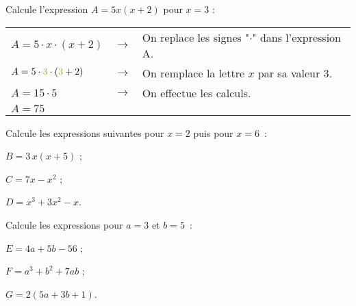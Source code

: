 \begin{methode*1}
 
\begin{exemple*1}
Calcule l'expression $A = 5x(x + 2)$ pour $x = 3$ :
\begin{center}
 \begin{tabular}{lcl}
$A = 5 \cdot x \cdot (x + 2)$ & $\longrightarrow$ & On replace les signes "$\cdot$" dans l'expression A. \\
$A = 5 \cdot \textcolor{H1}{3} \cdot (\textcolor{H1}{3} + 2)$ & $\longrightarrow$ & On remplace la lettre $x$ par sa valeur \textcolor{H1}{3}. \\ %
$A = 15 \cdot 5$ & $\longrightarrow$ &  On effectue les calculs. \\
$A= 75$ & & \\
  \end{tabular}
 \end{center}
\end{exemple*1}

\exercice  
Calcule les expressions suivantes pour $x = 2$ puis pour $x = 6$ :

$B = 3\,x(x + 5)$ ;

$C = 7x - x^2$ ;

$D = x^3 + 3x^2 - x$.

\exercice  
Calcule les expressions pour $a = 3$ et $b = 5$ :
     
$E = 4a + 5b - 56$ ;

$F = a^3 + b^2 + 7ab$ ;

$G = 2(5a + 3b + 1)$.

\end{methode*1}